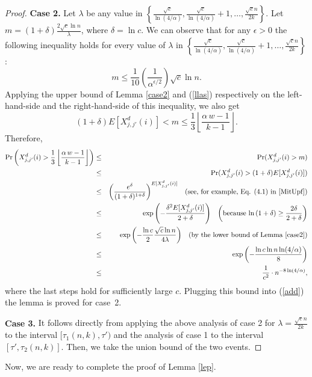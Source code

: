 \documentclass[11pt]{article}
\begin{document}
\begin{proof}
\medskip
\textbf{Case 2.}
Let $\lambda$ be any value in $\left\{ \frac{\sqrt{c}}{\ln({4}/{\alpha})}, \frac{\sqrt{c}}{\ln({4}/{\alpha})} +1 ,\ldots, \frac{\sqrt{c} n}{2 k} \right\}$.
Let $m = (1 + \delta) \frac{2 \sqrt{c} \ln n}{\lambda}$, where $\delta = \ln{c}$. 
We can observe that for any $\epsilon > 0$ the following inequality holds
for every value of $\lambda$ in 
$\left\{ \frac{\sqrt{c}}{\ln({4}/{\alpha})}, \frac{\sqrt{c}}{\ln({4}/{\alpha})} +1 ,\ldots, \frac{\sqrt{c} n}{2 k} \right\}$:
\[
   m \le \frac{1}{10} \left( \frac{1}{\alpha^{\epsilon/2}}  \right) \sqrt{c} \ln n.
\]
Applying the upper bound of Lemma \ref{case2} and (\ref{llas}) 
respectively on the left-hand-side and the right-hand-side
of this inequality, we also get
\[
 (1+\delta) E[X^d_{j,j'}(i)] < m \le \frac{1}{3}\left \lfloor \frac{\alpha\, w - 1}{k-1} \right \rfloor .
\]
Therefore,
\begin{eqnarray*}
    \Pr\left(X^d_{j,j'}(i)  >  \frac{1}{3}\left \lfloor \frac{\alpha\, w - 1}{k-1} \right \rfloor \right) 
    & \le & \Pr(X^d_{j,j'}(i) > m) \\
    & \le & \Pr(X^d_{j,j'}(i) > (1 + \delta) E[X^d_{j,j'}(i)] ) \\
    & \le & \left ( \frac{e^{\delta}}{(1+\delta)^{1+\delta}} \right )^{E[X^d_{j,j'}(i)]} \;\;\; 
    \text{(see, for example, Eq. (4.1) in \cite{MitUpf})} \\     
    &\le & \exp\left(-\frac{\delta^2 E[X^d_{j,j'}(i)]}{2 + \delta}\right) 
    \;\;\; \left(\text{because $\ln\left(1+\delta \right) \ge \frac{2\delta}{2+\delta}$}\right)  \\
    &\le & \exp\left(-\frac{\ln{c}}{2} \frac{\sqrt{c}\ln n}{4\lambda} \right) 
    \;\;\; \text{(by the lower bound of Lemma \ref{case2})} \\   
    &\le & \exp\left(-\frac{\ln{c}\ln n \ln(4/\alpha)}{8} \right) \\
    & \le &  \frac{1}{c^2} \cdot n^{-8\ln(4/\alpha)},
\end{eqnarray*}
where the last steps hold for sufficiently large $c$. Plugging this bound into (\ref{add}) the lemma
is proved for case~2.

\medskip
\textbf{Case 3.}
{It follows directly from applying the above analysis of case 2 for $\lambda=\frac{\sqrt{c}n}{2k}$ to the interval $[\tau_1(n,k),\tau')$ and the analysis of case 1 to the interval $[\tau',\tau_2(n,k)]$.
Then, we take the union bound of the two events.}
\end{proof}

Now, we are ready to complete the proof of Lemma \ref{lep}.
\end{document}
